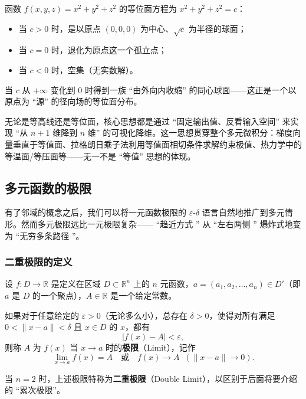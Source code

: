 \documentclass[lang=cn,11pt]{elegantbook}
\begin{document}
\begin{exercise}[球面等位面族]
函数 $f(x,y,z)=x^2+y^2+z^2$ 的等位面方程为 $x^2+y^2+z^2=c$：
\begin{itemize}
  \item 当 $c>0$ 时，是以原点 $(0,0,0)$ 为中心、$\sqrt{c}$ 为半径的球面；
  \item 当 $c=0$ 时，退化为原点这一个孤立点；
  \item 当 $c<0$ 时，空集（无实数解）。
\end{itemize}
当 $c$ 从 $+\infty$ 变化到 $0$ 时得到一族 ``由外向内收缩'' 的同心球面——这正是一个以原点为 ``源'' 的径向场的等位面分布。
\end{exercise}

\begin{remark}[等值方法的普适性]
无论是等高线还是等位面，核心思想都是通过 ``固定输出值、反看输入空间'' 来实现 ``从 $n+1$ 维降到 $n$ 维'' 的可视化降维。这一思想贯穿整个多元微积分：梯度向量垂直于等值面、拉格朗日乘子法利用等值面相切条件求解约束极值、热力学中的等温面/等压面等——无一不是 ``等值'' 思想的体现。
\end{remark}


\subsection{多元函数的极限}

有了邻域的概念之后，我们可以将一元函数极限的 $\varepsilon$-$\delta$ 语言自然地推广到多元情形。然而多元极限远比一元极限复杂—— ``趋近方式 '' 从 ``左右两侧 '' 爆炸式地变为 ``无穷多条路径 ''。


\subsubsection{二重极限的定义}

\begin{definition}[$n$ 元函数的极限] \label{def:multivar-limit}
设 $f:D\to\mathbb{R}$ 是定义在区域 $D\subset\mathbb{R}^n$ 上的 $n$ 元函数，$a=(a_1,a_2,\dots,a_n)\in D'$（即 $a$ 是 $D$ 的一个聚点），$A\in\mathbb{R}$ 是一个给定常数。

如果对于任意给定的 $\varepsilon>0$（无论多么小），总存在 $\delta>0$，使得对所有满足 $0<\|x-a\|<\delta$ 且 $x\in D$ 的 $x$，都有
\[
|f(x)-A|<\varepsilon,
\]
则称 $A$ 为 $f(x)$ 当 $x\to a$ 时的\textbf{极限}（Limit），记作
\[
\lim_{x\to a}f(x)=A\quad\text{或}\quad f(x)\to A\;\;(\|x-a\|\to 0).
\]
\end{definition}

当 $n=2$ 时，上述极限特称为\textbf{二重极限}（Double Limit），以区别于后面将要介绍的 ``累次极限''。
\end{document}
